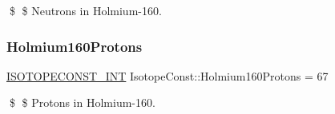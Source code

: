 \$ \$ Neutrons in Holmium-\/160. \mbox{\label{group___isotope_const-_holmium-_ho160_gad82b0632d74273774af2b075ad9a2980}} 
\subsubsection{\texorpdfstring{Holmium160\+Protons}{Holmium160Protons}}
{\footnotesize\ttfamily \mbox{\hyperlink{group___isotope_const-_macros_ga5f18360b3e99483a35c32d789e62621c}{I\+S\+O\+T\+O\+P\+E\+C\+O\+N\+S\+T\+\_\+\+I\+NT}} Isotope\+Const\+::\+Holmium160\+Protons = 67}

\$ \$ Protons in Holmium-\/160. 